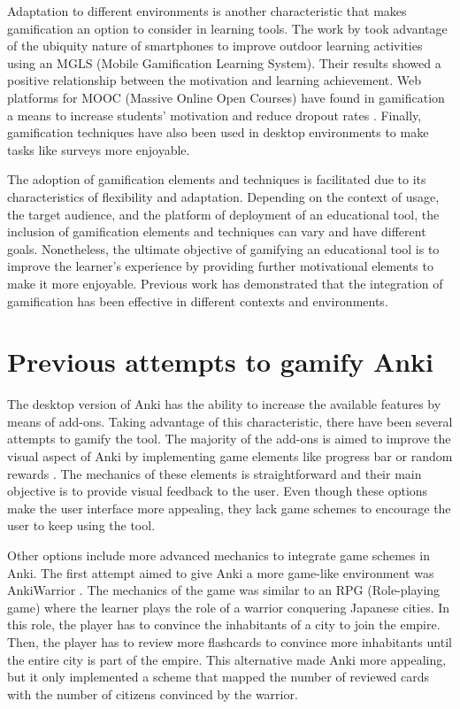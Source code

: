Adaptation to different environments is another characteristic that makes gamification an option to consider in learning tools. The work by \citep{su2015mobile} took advantage of the ubiquity nature of smartphones to improve outdoor learning activities using an MGLS (Mobile Gamification Learning System). Their results showed a positive relationship between the motivation and learning achievement. Web platforms for MOOC (Massive Online Open Courses) have found in gamification a means to increase students' motivation and reduce dropout rates \citep{gene2014gamification}. Finally, gamification techniques have also been used in desktop environments to make tasks like surveys more enjoyable\citep{cheong2013quick}.

The adoption of gamification elements and techniques is facilitated due to its characteristics of flexibility and adaptation. Depending on the context of usage, the target audience, and the platform of deployment of an educational tool, the inclusion of gamification elements and techniques can vary and have different goals. Nonetheless, the ultimate objective of gamifying an educational tool is to improve the learner's experience by providing further motivational elements to make it more enjoyable. Previous work has demonstrated that the integration of gamification has been effective in different contexts and environments.

\section{Previous attempts to gamify Anki}
The desktop version of Anki has the ability to increase the available features by means of add-ons. Taking advantage of this characteristic, there have been several attempts to gamify the tool. The majority of the add-ons is aimed to improve the visual aspect of Anki by implementing game elements like progress bar \citep{glut2017progress} or random rewards \citep{glut2017puppy}. The mechanics of these elements is straightforward and their main objective is to provide visual feedback to the user. Even though these options make the user interface more appealing, they lack game schemes to encourage the user to keep using the tool.

Other options include more advanced mechanics to integrate game schemes in Anki. The first attempt aimed to give Anki a more game-like environment was AnkiWarrior \citep{proxx2010warrior}. The mechanics of the game was similar to an RPG (Role-playing game) where the learner plays the role of a warrior conquering Japanese cities. In this role, the player has to convince the inhabitants of a city to join the empire. Then, the player has to review more flashcards to convince more inhabitants until the entire city is part of the empire. This alternative made Anki more appealing, but it only implemented a scheme that mapped the number of reviewed cards with the number of citizens convinced by the warrior.

